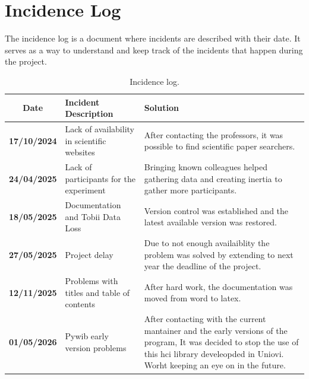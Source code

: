 \section{Incidence Log}
The incidence log is a document where incidents are described with their date. It serves as a way to understand and keep
track of the incidents that happen during the project.
\begin{table} [H]
    \centering
    \small
    \caption{Incidence log.}
    \label{tab:incidence_log}
    \setlength{\tabcolsep}{4pt}
    
    \begin{tabularx}{\textwidth} { 
        | c 
        | >{\raggedright\arraybackslash}X 
        | >{\raggedright\arraybackslash}X | 
    }
        \hline 
        \textbf{Date} & \textbf{Incident Description} & \textbf{Solution} \\ \hline
        \textbf{17/10/2024} & Lack of availability in scientific websites & After contacting the professors, it was possible
        to find scientific paper searchers. \\ \hline
        \textbf{24/04/2025} & Lack of participants for the experiment & Bringing known colleagues helped gathering data and creating
        inertia to gather more participants. \\ \hline
        \textbf{18/05/2025} & Documentation and Tobii Data Loss & Version control was established and the latest available version was restored. \\ \hline
        \textbf{27/05/2025} & Project delay & Due to not enough availaiblity the problem was solved by extending to next year the deadline of the project. \\ \hline
        \textbf{12/11/2025} & Problems with titles and table of contents & After hard work, the documentation was moved from word to latex. \\ \hline
        \textbf{01/05/2026} & Pywib early version problems & After contacting with the current mantainer and the early versions of the program,
                              It was decided to stop the use of this hci library develeopded in Uniovi. Worht keeping an eye on in the future. \\ \hline
    \end{tabularx}
\end{table}
